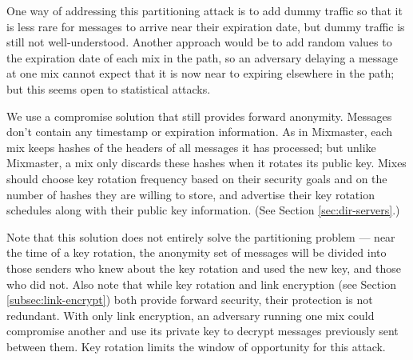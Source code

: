 \documentclass[final,inpress,inline]{ieee}
\begin{document}

One way of addressing this partitioning attack is to add dummy traffic
so that it is less rare for messages to arrive near their expiration date,
but dummy traffic is still not well-understood. Another approach would
be to add random values to the expiration date of each mix in the path,
so an adversary delaying a message at one mix cannot expect that it
is now near to expiring elsewhere in the path; but this seems open to
statistical attacks.


We use a compromise solution that still provides forward anonymity.  Messages
don't contain any timestamp or expiration information. As in Mixmaster, each
mix keeps hashes of the headers of all messages it has processed; but unlike
Mixmaster, a mix only discards these hashes when it rotates its public
key. Mixes
should choose key rotation frequency based on their security goals and on the
number of hashes they are willing to store, and advertise their key rotation
schedules along with their public key information.  (See Section
\ref{sec:dir-servers}.)

Note that this solution does not entirely solve the partitioning problem
--- near the time of a key rotation, the anonymity set of messages will
be divided into those senders who knew about the key rotation and used
the new key, and those who did not. %
Also note that while key rotation and link encryption (see Section
\ref{subsec:link-encrypt}) both provide forward security, their protection
is not redundant. With only link encryption, an adversary running
one mix could compromise another and use its private key to decrypt
messages previously sent between them. Key rotation limits the window
of opportunity for this attack.

\end{document}

